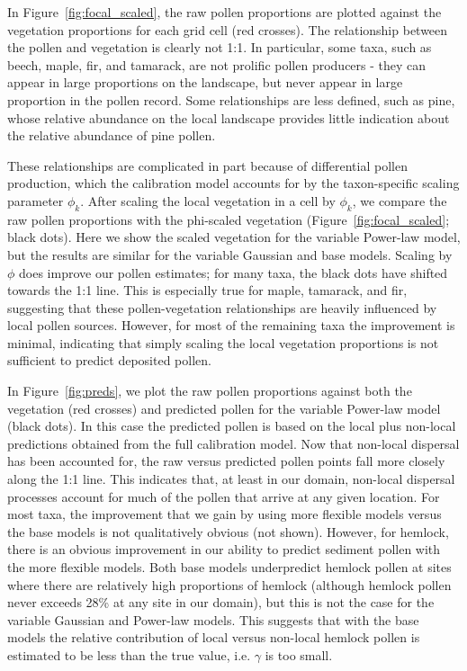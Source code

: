 \documentclass[12pt]{article}
\begin{document}
In Figure~\ref{fig:focal_scaled}, the raw pollen proportions are
plotted against the vegetation proportions for each grid cell (red
crosses). The relationship between the pollen and vegetation is
clearly not 1:1. In particular, some taxa, such as beech, maple, fir,
and tamarack, are not prolific pollen producers - they can appear in
large proportions on the landscape, but never appear in large
proportion in the pollen record. Some relationships are less defined,
such as pine, whose relative abundance on the local landscape provides
little indication about the relative abundance of pine pollen.

These relationships are complicated in part because of differential
pollen production, which the calibration model accounts for by the
taxon-specific scaling parameter $\phi_k$. After scaling the local
vegetation in a cell by $\phi_k$, we compare the raw pollen
proportions with the phi-scaled vegetation
(Figure~\ref{fig:focal_scaled}; black dots). Here we show the scaled
vegetation for the variable Power-law model, but the results are
similar for the variable Gaussian and base models. Scaling by $\phi$
does improve our pollen estimates; for many taxa, the black dots have
shifted towards the 1:1 line. This is especially true for maple,
tamarack, and fir, suggesting that these pollen-vegetation
relationships are heavily influenced by local pollen sources. However,
for most of the remaining taxa the improvement is minimal, indicating
that simply scaling the local vegetation proportions is not sufficient
to predict deposited pollen.

In Figure~\ref{fig:preds}, we plot the raw pollen proportions against
both the vegetation (red crosses) and predicted pollen for the
variable Power-law model (black dots). In this case the predicted
pollen is based on the local plus non-local predictions obtained from
the full calibration model. Now that non-local dispersal has been
accounted for, the raw versus predicted pollen points fall more
closely along the 1:1 line. This indicates that, at least in our
domain, non-local dispersal processes account for much of the pollen
that arrive at any given location. For most taxa, the improvement that
we gain by using more flexible models versus the base models is not
qualitatively obvious (not shown). However, for hemlock, there is an
obvious improvement in our ability to predict sediment pollen with the
more flexible models. Both base models underpredict hemlock pollen at
sites where there are relatively high proportions of hemlock (although
hemlock pollen never exceeds 28\% at any site in our domain), but this
is not the case for the variable Gaussian and Power-law models. This
suggests that with the base models the relative contribution of local
versus non-local hemlock pollen is estimated to be less than the true
value, i.e. $\gamma$ is too small.
\end{document}
